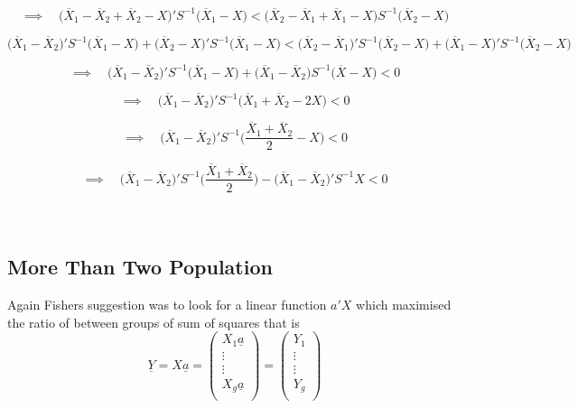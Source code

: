 \documentclass[11pt,a4paper]{article}
\theoremstyle{definition}
\begin{document}
$$\implies \quad  \big(\overline{X}_1 -\overline{X}_2 + \overline{X}_2 - X\big)'S^{-1}\big(\overline{X}_1 - X\big) < \big(\overline{X}_2 - \overline{X}_1 + \overline{X}_1 - X\big) S^{-1}\big(\overline{X}_2-X\big)$$

$$\big(\overline{X}_1-\overline{X}_2\big)'S^{-1}\big(\overline{X}_1-X\big) + \big(\overline{X}_2-X\big)'S^{-1}\big(\overline{X}_1-X\big) < \big(\overline{X}_2-\overline{X}_1\big)'S^{-1}\big(\overline{X}_2-X\big) + \big(\overline{X}_1-X\big)'S^{-1}\big(\overline{X}_2-X\big)$$

$$\implies \quad  \big(\overline{X}_1-\overline{X}_2\big)'S^{-1}\big(\overline{X}_1-X\big) + \big(\overline{X}_1-\overline{X}_2\big) S^{-1}\big(\overline{X}-X\big) <0$$

$$\implies \quad  \big(\overline{X}_1-\overline{X}_2\big)'S^{-1}\big(\overline{X}_1+\overline{X}_2-2X\big) < 0$$

$$\implies \quad  \big(\overline{X}_1-\overline{X}_2\big)'S^{-1}\Bigg(\frac{\overline{X}_1+\overline{X}_2}{2}-X\Bigg) < 0$$

$$\implies \quad  \big(\overline{X}_1-\overline{X}_2\big)'S^{-1}\Bigg(\frac{\overline{X}_1+\overline{X}_2}{2}\Bigg) - \big(\overline{X}_1-\overline{X}_2\big)'S^{-1}X <0$$\\\\






\subsection{More Than Two Population}
Again Fishers suggestion was to look for a linear function $a'X$ which maximised the ratio of between groups of sum of squares that is \begin{equation}\tag{5}
\underline{Y}=X\underline{a}=
\begin{pmatrix}
X_1\underline{a}\\
\vdots\\
\vdots\\
X_g\underline{a}\\
\end{pmatrix}
=\begin{pmatrix}
Y_1\\
\vdots\\
\vdots\\
Y_g\\
\end{pmatrix}
\end{equation}
\end{document}
